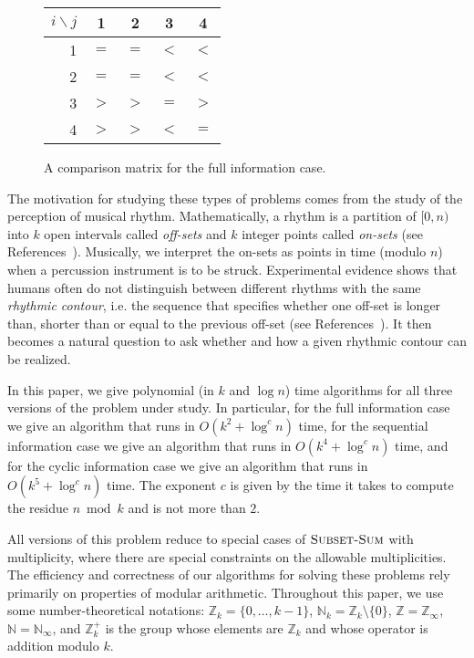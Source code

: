 \documentclass[11pt]{patmorin}
\newcommand{\Z}{\mathbb{Z}}
\newcommand{\N}{\mathbb{N}}
\newcommand{\defeq}{=}
\begin{document}
\begin{figure}
\begin{center}
\begin{tabular}{r|cccc}
$i\backslash j$ & 1 & 2 & 3 & 4 \\ \hline
1 & $=$ & $=$ & $<$ & $<$ \\
2 & $=$ & $=$ & $<$ & $<$ \\
3 & $>$ & $>$ & $=$ & $>$ \\
4 & $>$ & $>$ & $<$ & $=$ \\
\end{tabular}
\end{center}
\caption{A comparison matrix for the full information case.}
\end{figure}

The motivation for studying these types of problems comes from the
study of the perception of musical rhythm.  Mathematically, a rhythm
is a partition  of $[0,n)$ into $k$ open intervals called
\emph{off-sets} and $k$ integer points called \emph{on-sets} (see
References~\cite{dfgrt04,t02,t03a,t03b,t04}).  Musically, we interpret
the on-sets as points in time (modulo $n$) when a percussion
instrument is to be struck.  Experimental evidence shows that humans
often do not distinguish between different rhythms with the same
\emph{rhythmic contour}, i.e.  the sequence that specifies whether one
off-set is longer than, shorter than or equal to the previous off-set
(see References~\cite{d78,ftrkp04,kcgv00,l96}).  It then becomes a
natural question to ask whether and how a given rhythmic contour can
be realized.

In this paper, we give polynomial (in $k$ and $\log n$) time
algorithms for all three versions of the problem under study.  In
particular, for the full information case we give an algorithm that
runs in $O(k^2 + \log^cn)$ time, for the sequential information case
we give an algorithm that runs in $O(k^4+\log^c n)$ time, and for the
cyclic information case we give an algorithm that runs in
$O(k^5+\log^c n)$ time.  The exponent $c$ is given by the time it
takes to compute the residue $n\bmod k$ and is not more than $2$.

All versions of this problem reduce to special cases of
$\textsc{Subset-Sum}$ with multiplicity, where there are special
constraints on the allowable multiplicities.  The efficiency and
correctness of our algorithms for solving these problems rely
primarily on properties of modular arithmetic. Throughout this paper,
we use some number-theoretical notations: $\Z_k\defeq
\{0,\ldots,k-1\}$, $\N_k\defeq\Z_k\setminus\{0\}$,
$\Z\defeq\Z_\infty$, $\N\defeq\N_\infty$, and $\Z_k^+$ is the group
whose elements are $\Z_k$ and whose operator is addition modulo $k$.
\end{document}
